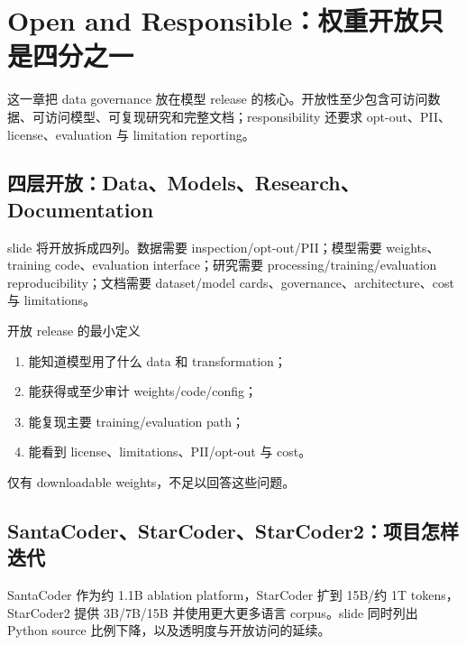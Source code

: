 \section{Open and Responsible：权重开放只是四分之一}

这一章把 data governance 放在模型 release 的核心。开放性至少包含可访问数据、可访问模型、可复现研究和完整文档；responsibility 还要求 opt-out、PII、license、evaluation 与 limitation reporting。

\subsection{四层开放：Data、Models、Research、Documentation}

slide 将开放拆成四列。数据需要 inspection/opt-out/PII；模型需要 weights、training code、evaluation interface；研究需要 processing/training/evaluation reproducibility；文档需要 dataset/model cards、governance、architecture、cost 与 limitations。


\begin{importantbox}{开放 release 的最小定义}
\begin{enumerate}
  \item 能知道模型用了什么 data 和 transformation；
  \item 能获得或至少审计 weights/code/config；
  \item 能复现主要 training/evaluation path；
  \item 能看到 license、limitations、PII/opt-out 与 cost。
\end{enumerate}
仅有 downloadable weights，不足以回答这些问题。
\end{importantbox}


\subsection{SantaCoder、StarCoder、StarCoder2：项目怎样迭代}

SantaCoder 作为约 1.1B ablation platform，StarCoder 扩到 15B/约 1T tokens，StarCoder2 提供 3B/7B/15B 并使用更大更多语言 corpus。slide 同时列出 Python source 比例下降，以及透明度与开放访问的延续。

